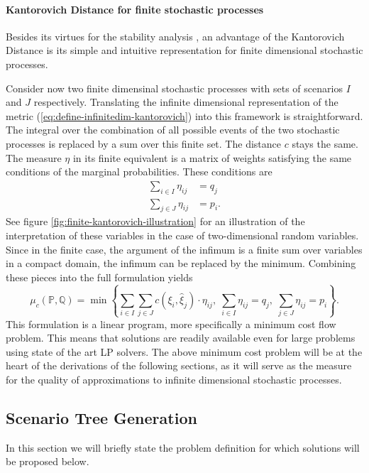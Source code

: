 \paragraph{Kantorovich Distance for finite stochastic processes}
Besides its virtues for the stability analysis \cite{Dupacova2003}, an advantage of the Kantorovich Distance is its simple and intuitive representation for finite dimensional stochastic processes.

Consider now two finite dimensinal stochastic processes with sets of scenarios $I$ and $J$ respectively.
Translating the infinite dimensional representation of the metric (\ref{eq:define-infinitedim-kantorovich}) into this framework is straightforward.
The integral over the combination of all possible events of the two stochastic processes is replaced by a sum over this finite set.
The distance $c$ stays the same.
The measure $\eta$ in its finite equivalent is a matrix of weights satisfying the same conditions of the marginal probabilities.
These conditions are
\begin{align}
  \label{eq:finitedim-marginals-eta}
  \sum_{i\in I} \eta_{ij} &= q_j\\
  \sum_{j\in J} \eta_{ij} &= p_i.
\end{align}
See figure \ref{fig:finite-kantorovich-illustration} for an illustration of the interpretation of these variables in the case of two-dimensional random variables.
Since in the finite case, the argument of the infimum is a finite sum over variables in a compact domain, the infimum can be replaced by the minimum. Combining these pieces into the full formulation yields
\begin{equation}
  \label{eq:define-finitedim-Kantorovich}
  \mu_c(\mathbb{P}, \mathbb{Q}) = \min\left\{\sum_{i\in I}\sum_{j\in J}c(\xi_i,\hat{\xi}_j)\cdot \eta_{ij},\; \sum_{i\in I}\eta_{ij}=q_j,\;\sum_{j\in J}\eta_{ij}=p_i\right\}.
\end{equation}
This formulation is a linear program, more specifically a minimum cost flow problem. This means that solutions are readily available even for large problems using state of the art LP solvers. The above minimum cost problem will be at the heart of the derivations of the following sections, as it will serve as the measure for the quality of approximations to infinite dimensional stochastic processes.
\subsection{Scenario Tree Generation}
In this section we will briefly state the problem definition for which solutions will be proposed below.
